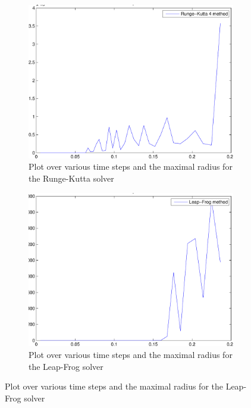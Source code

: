 \documentclass[a4paper,12pt, english]{article}
\begin{document}
	
\begin{figure}
	\begin{subfigure}
		\centering
		\includegraphics[scale=0.5]{timestep_rk4.pdf}
		\caption{Plot over various time steps and the maximal radius for the Runge-Kutta solver}
		\label{fig:RK4_timestep}
	\end{subfigure}

	\begin{subfigure}
		\centering
		\includegraphics[scale=0.5]{timestep_LeapFrog.pdf}
		\caption{Plot over various time steps and the maximal radius for the Leap-Frog solver}
		\label{fig:LF_timestep}
	\end{subfigure}
	\label{timestep}
\end{figure}
\end{document}
